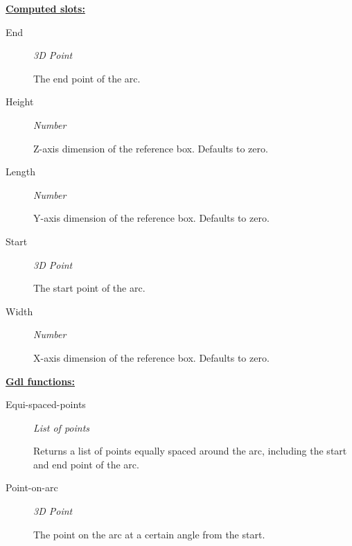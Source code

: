 \documentclass [11pt]{book}
\begin{document}
\begin{itemize}
\begin{description}
\end{description}






\textbf{
\underline{Computed slots:}}

\begin{description}

\item [End]
\emph{3D Point}

 The end point of the arc.




\item [Height]
\emph{Number}

 Z-axis dimension of the reference box. Defaults to zero.




\item [Length]
\emph{Number}

 Y-axis dimension of the reference box. Defaults to zero.




\item [Start]
\emph{3D Point}

 The start point of the arc.




\item [Width]
\emph{Number}

 X-axis dimension of the reference box. Defaults to zero.




\end{description}






\textbf{
\underline{Gdl functions:}}

\begin{description}

\item [Equi-spaced-points]
\emph{List of points}

 Returns a list of points equally spaced around the arc, including
the start and end point of the arc.




\item [Point-on-arc]
\emph{3D Point}

 The point on the arc at a certain angle from the start.





\end{description}
\end{itemize}
\end{document}
